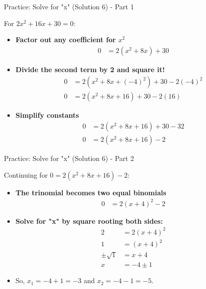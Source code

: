 \documentclass[aspectratio=169]{beamer}
\begin{document}
\begin{frame}{Practice: Solve for "x" (Solution 6) - Part 1}
    \begin{tcolorbox}[colback=lightgray,colframe=accent,title=Solution 6 - Part 1]
        \footnotesize
        For $2x^2 + 16x + 30 = 0$:
        \begin{itemize}
            \item \textbf{Factor out any coefficient for $x^2$}
                \begin{align*}
                    0 &= 2(x^2 + 8x) + 30
                \end{align*}
            \item \textbf{Divide the second term by 2 and square it!}
                \begin{align*}
                    0 &= 2(x^2 + 8x + (-4)^2) + 30 - 2(-4)^2 \\
                    0 &= 2(x^2 + 8x + 16) + 30 - 2(16)
                \end{align*}
            \item \textbf{Simplify constants}
                \begin{align*}
                    0 &= 2(x^2 + 8x + 16) + 30 - 32 \\
                    0 &= 2(x^2 + 8x + 16) - 2
                \end{align*}
        \end{itemize}
    \end{tcolorbox}
\end{frame}

\begin{frame}{Practice: Solve for "x" (Solution 6) - Part 2}
    \begin{tcolorbox}[colback=lightgray,colframe=accent,title=Solution 6 - Part 2 (Cont.)]
        \footnotesize
        Continuing for $0 = 2(x^2 + 8x + 16) - 2$:
        \begin{itemize}
            \item \textbf{The trinomial becomes two equal binomials}
                \begin{align*}
                    0 &= 2(x+4)^2 - 2
                \end{align*}
            \item \textbf{Solve for "x" by square rooting both sides:}
                \begin{align*}
                    2 &= 2(x+4)^2 \\
                    1 &= (x+4)^2 \\
                    \pm\sqrt{1} &= x+4 \\
                    x &= -4 \pm 1
                \end{align*}
            \item So, $x_1 = -4 + 1 = -3$ and $x_2 = -4 - 1 = -5$.
        \end{itemize}
    \end{tcolorbox}
\end{frame}
\end{document}
